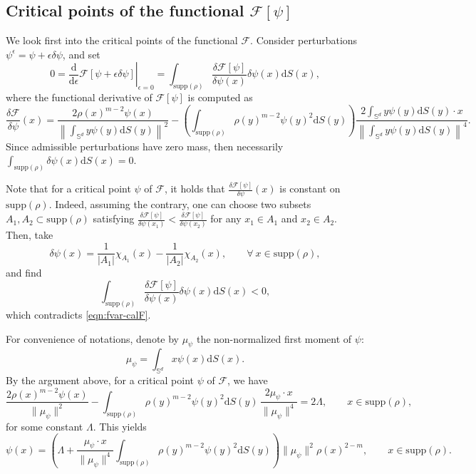 \documentclass[11pt]{amsart}
\newcommand{\bbs}{\mathbb S}
\newcommand{\calF}{\mathcal{F}}
\def\d{\mathrm{d}}
\newcommand{\dx}{\mathrm{d}S (x)}
\newcommand{\dy}{\mathrm{d}S (y)}
\newcommand{\supp}{\mathrm{supp}(\rho)}
\newcommand{\dm}{d} %
\begin{document}
\subsection{Critical points of the functional $\calF[\psi]$} We look first into the critical points of the functional $\mathcal{F}$. Consider perturbations $\psi^\epsilon = \psi + \epsilon \delta \psi$, and set
\begin{equation}
\label{eqn:fvar-calF}
0= \left. \frac{\d}{\d\epsilon}\mathcal{F}[\psi+\epsilon\delta\psi] \right |_{\epsilon =0}=\int_{\supp}\frac{\delta\mathcal{F}[\psi]}{\delta\psi(x)}\delta\psi(x)\dx,
\end{equation}
where the functional derivative of $\mathcal{F}[\psi]$ is computed as
\[
\frac{\delta\mathcal{F}}{\delta\psi}(x)=\frac{2\rho(x)^{m-2}\psi(x)}{\left \| \int_{\bbs^\dm} y \psi(y) \dy \right \|^2}- \left( \int_{\supp}\rho(y)^{m-2}\psi(y)^2\dy \right) \frac{2 \int_{\bbs^\dm} y \psi(y) \dy \cdot x}{\left \| \int_{\bbs^\dm} y \psi(y) \dy \right \|^4}.
\]
Since admissible perturbations have zero mass, then necessarily $\int_{\supp} \delta \psi(x) \dx =0$.

Note that for a critical point $\psi$ of $\mathcal{F}$, it holds that $\frac{\delta\mathcal{F}[\psi]}{\delta\psi}(x)$ is constant on $\supp$. Indeed, assuming the contrary, one can choose two subsets $A_1, A_2\subset \supp$ satisfying $\frac{\delta\mathcal{F}[\psi]}{\delta\psi(x_1)}<\frac{\delta\mathcal{F}[\psi]}{\delta\psi(x_2)}$ for any $x_1\in A_1$ and $x_2\in A_2$. Then, take
\[
\delta\psi(x)=\frac{1}{|A_1|}\chi_{A_1}(x)-\frac{1}{|A_2|}\chi_{A_2}(x), \qquad \forall~x \in \supp,
\]
and find
\[
\int_{\supp}\frac{\delta\mathcal{F}[\psi]}{\delta\psi(x)}\delta\psi(x)\dx<0,
\]
which contradicts \eqref{eqn:fvar-calF}.

For convenience of notations, denote by $\mu_{\psi}$ the non-normalized first moment of $\psi$:
\[
\mu_{\psi} = \int_{\bbs^\dm} x \psi(x) \dx.
\]
By the argument above, for a critical point $\psi$ of $\mathcal{F}$, we have 
\begin{equation}
\label{eqn:EL-calF}
\frac{2\rho(x)^{m-2}\psi(x)}{\|\mu_{\psi}\|^2}-\int_{\supp}\rho(y)^{m-2}\psi(y)^2\dy \, \frac{2\mu_{\psi}\cdot x}{\|\mu_{\psi}\|^4}=2\Lambda,\qquad x \in \supp, 
\end{equation}
for some constant $\Lambda$. This yields
\begin{equation}
\label{eqn:phi-1}
\psi(x)=\left(\Lambda+\frac{\mu_{\psi}\cdot x}{\|\mu_{\psi}\|^4}\int_{\supp}\rho(y)^{m-2}\psi(y)^2\dy \right)\|\mu_{\psi}\|^2\rho(x)^{2-m}, \qquad x \in \supp.
\end{equation}
\end{document}
